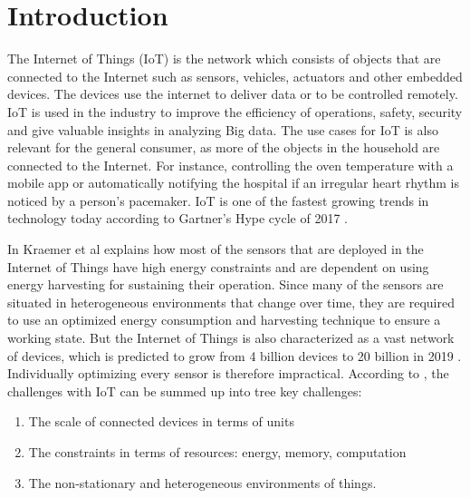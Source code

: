 \chapter{Introduction}



The Internet of Things (IoT) is the network which consists of objects that are connected to the Internet such as sensors, vehicles, actuators and other embedded devices. The devices use the internet to deliver data or to be controlled remotely. IoT is used in the industry to improve the efficiency of operations, safety, security and give valuable insights in analyzing Big data. The use cases for IoT is also relevant for the general consumer, as more of the objects in the household are connected to the Internet. For instance, controlling the oven temperature with a mobile app or automatically notifying the hospital if an irregular heart rhythm is noticed by a person's pacemaker. IoT is one of the fastest growing trends in technology today according to Gartner's Hype cycle of 2017 \cite{Gartner}.



In \cite{kraemer} Kraemer et al explains how most of the sensors that are deployed in the Internet of Things have high energy constraints and are dependent on using energy harvesting for sustaining their operation. Since many of the sensors are situated in heterogeneous environments that change over time, they are required to use an optimized energy consumption and harvesting technique to ensure a working state. But the Internet of Things is also characterized as a vast network of devices, which is predicted to grow from 4 billion devices to 20 billion in 2019 \cite{IEA}. Individually optimizing every sensor is therefore impractical. According to \cite{frank}, the challenges with IoT can be summed up into tree key challenges: 
\begin{enumerate}
    \item The scale of connected devices in terms of units
    \item The constraints in terms of resources: energy, memory, computation
    \item The non-stationary and heterogeneous environments of things.
    \label{challenges}
    
\end{enumerate}

